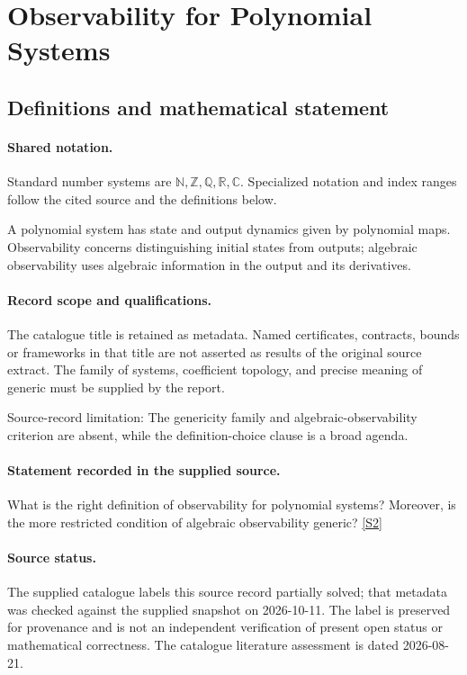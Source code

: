 \documentclass[11pt]{article}
\newcommand{\sref}[2]{\hyperlink{source:#1:#2}{[S#2]}}
\begin{document}
\section{Observability for Polynomial Systems}\label{statement}

\subsection{Definitions and mathematical statement}

\paragraph{Shared notation.}Standard number systems are $\mathbb N,\mathbb Z,\mathbb Q,\mathbb R,\mathbb C$. Specialized notation and index ranges follow the cited source and the definitions below.


A polynomial system has state and output dynamics given by polynomial maps. Observability concerns distinguishing initial states from outputs; algebraic observability uses algebraic information in the output and its derivatives.
\paragraph{Record scope and qualifications.}
The catalogue title is retained as metadata. Named certificates, contracts, bounds or frameworks in that title are not asserted as results of the original source extract.
The family of systems, coefficient topology, and precise meaning of generic must be supplied by the report.

Source-record limitation: The genericity family and algebraic-observability criterion are absent, while the definition-choice clause is a broad agenda.
\paragraph{Statement recorded in the supplied source.}
What is the right definition of observability for polynomial systems? Moreover, is the more restricted condition of algebraic observability generic? \sref{statement}{2}
\paragraph{Source status.}
The supplied catalogue labels this source record partially solved; that metadata was checked against the supplied snapshot on 2026-10-11. The label is preserved for provenance and is not an independent verification of present open status or mathematical correctness. The catalogue literature assessment is dated 2026-08-21.
\end{document}
